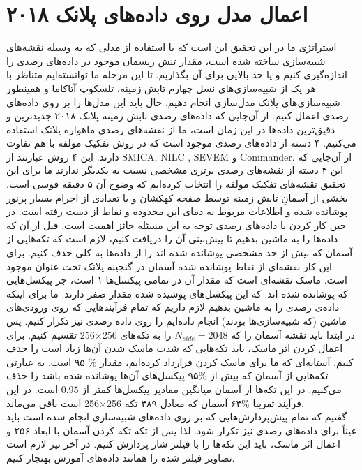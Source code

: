 \section{اعمال مدل روی داده‌های پلانک ۲۰۱۸}
\label{sec:data_results}
استراتژی ما در این تحقیق این است که با استفاده از مدلی که به وسیله نقشه‌های شبیه‌سازی ساخته شده‌ است، مقدار تنش ریسمان موجود در داده‌های رصدی را اندازه‌گیری کنیم و یا حد بالایی برای آن بگذاریم. تا این مرحله ما توانسته‌ایم متناظر با هر یک از شبیه‌سازی‌های نسل چهارم تابش زمینه، تلسکوپ آتاکاما و همینطور شبیه‌سازی‌های پلانک مدل‌‌سازی انجام دهیم. حال باید این مدل‌ها را بر روی داده‌های رصدی اعمال کنیم. از آن‌جایی که داده‌های رصدی تابش زمینه پلانک ۲۰۱۸
\cite{calabrese2019planck}
جدیدترین و دقیق‌ترین داده‌ها در این زمان است، ما از نقشه‌های رصدی ماهواره پلانک استفاده می‌کنیم. ۴ دسته از داده‌های رصدی موجود است که در روش تفکیک مولفه با هم تفاوت دارند. این ۴ روش عبارتند از 
SMICA, NILC , SEVEM 
و 
Commander.
از آن‌جایی که این ۴ دسته از نقشه‌های رصدی برتری مشخصی نسبت به یکدیگر ندارند ما برای این تحقیق نقشه‌های تفکیک مولفه
را انتخاب کرده‌ایم که وضوح آن ۵ دقیقه قوسی است.
بخشی از آسمانِ تابش زمینه توسط صفحه کهکشان و یا تعدادی از اجرام بسیار پرنور پوشانده شده و اطلاعات مربوط به دمای این محدوده و نقاط از دست رفته است. در حین کار کردن با داده‌های رصدی توجه به این مسئله حائز اهمیت است. قبل از آن که داده‌ها را به ماشین بدهیم تا پیش‌بینی آن را دریافت کنیم، لازم است که تکه‌هایی از آسمان که بیش از حد مشخصی پوشانده شده اند را از داده‌ها به کلی حذف کنیم. برای این کار نقشه‌ای از نقاط پوشانده شده آسمان در گنجینه پلانک تحت عنوان 
 موجود است. ماسک نقشه‌ای است که مقدار آن در تمامی پیکسل‌ها ۱ است، جز پیکسل‌هایی که پوشانده شده اند. که این پیکسل‌های پوشیده شده مقدار صفر دارند. ما برای اینکه داده‌ی رصدی را به ماشین بدهیم لازم داریم که تمام فرآیندهایی که روی ورودی‌های ماشین (که شبیه‌سازی‌ها بودند) انجام داده‌ایم را روی داده رصدی نیز تکرار کنیم. پس در ابتدا باید نقشه آسمان را که
  $ N_{side} = 2048$ 
  	را به تکه‌های
 	 256$\times$256
 	  تقسیم کنیم. برای اعمال کردن اثر ماسک، باید تکه‌هایی که شدت ماسک شدن آن‌ها زیاد است را حذف کنیم. آستانه‌ای که ما برای ماسک کردن قرارداد کرده‌ایم، مقدار $\%$ ۹۵ است. به عبارتی تکه‌هایی از آسمان که بیش از $\%$۹۵ پیکسل‌های آن‌ها   پوشانده شده باشد را حذف می‌کنیم. در این تکه‌ها از آسمان میانگین مقادیر پیکسل‌ها کمتر از $0.95$ است. در این فرآیند تقریبا $\%$۶۴ آسمان که معادل ۴۸۹ تکه  256$\times$256 است باقی می‌ماند.
 	  \\
 	  گفتیم که تمام پیش‌پردازش‌هایی که بر روی داده‌های شبیه‌سازی انجام شده است باید عیناً برای داده‌های رصدی نیز تکرار شود. لذا پس از تکه تکه کردن آسمان با ابعاد ۲۵۶ و اعمال اثر ماسک، باید این تکه‌ها را با فیلتر شار پردازش کنیم. در آخر نیز لازم است تصاویر فیلتر شده را همانند داده‌های آموزش بهنجار کنیم. 
 	
